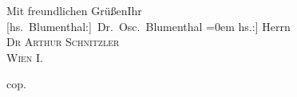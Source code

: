 \pstart
           Mit freundlichen Grüßen\hspace*{2.5em}Ihr{\\[\baselineskip]}\spacefill\mbox{{[}hs. Blumenthal:{]} Dr. Osc. Blumenthal}\pend
           \leftskip=0em{}
\pstart
           \noindent{}{[}hs.:{]} Herrn{\\}\textsc{Dr Arthur Schnitzler}{\\}\textsc{Wien I.}\pend
           
\pstart
           cop.\pend
           \endnumbering{}  \newcommand{\dateiname}{L00110}\newcommand{\titel}{Oscar Blumenthal an Arthur Schnitzler, 1. 8. 1892}\newcommand{\editorInnen}{Martin Anton Müller und Gerd-Hermann Susen}
